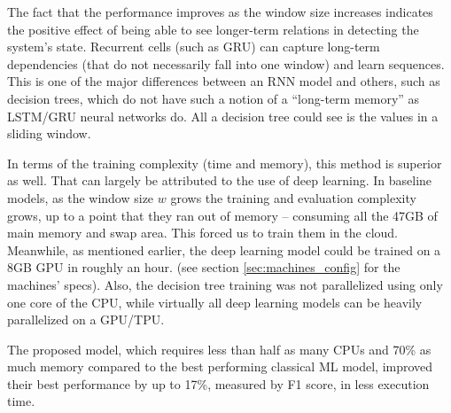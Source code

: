The fact that the performance improves as the window size increases indicates the positive effect of being able to see longer-term relations in detecting the system's state. Recurrent cells (such as GRU) can capture long-term dependencies (that do not necessarily fall into one window) and learn sequences. This is one of the major differences between an RNN model and others, such as decision trees, which do not have such a notion of a ``long-term memory'' as LSTM/GRU neural networks do. All a decision tree could see is the values in a sliding window.

In terms of the training complexity (time and memory), this method is superior as well. That can largely be attributed to the use of deep learning. In baseline models, as the window size $w$ grows the training and evaluation complexity grows, up to a point that they ran out of memory -- consuming all the 47GB of main memory and swap area. This forced us to train them in the cloud. Meanwhile, as mentioned earlier, the deep learning model could be trained on a 8GB GPU in roughly an hour. (see section \ref{sec:machines_config} for the machines' specs). Also, the decision tree training was not parallelized using only one core of the CPU, while virtually all deep learning models can be heavily parallelized on a GPU/TPU. %

\begin{rqanswer}
The proposed model, which requires less than half as many CPUs and 70\% as much memory compared to the best performing classical ML model, improved their best performance by up to 17\%, measured by F1 score, in less execution time.
\end{rqanswer}


